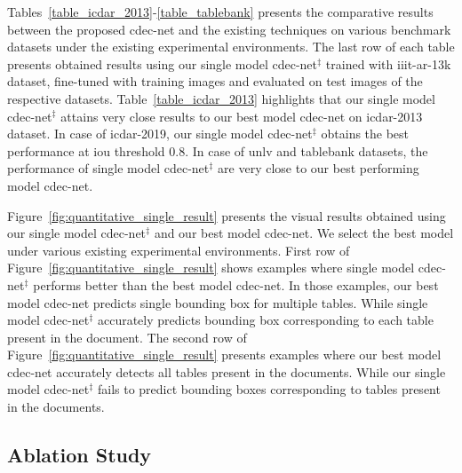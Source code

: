 \documentclass[a4paper,conference]{IEEEtran}
\begin{document}
Tables~\ref{table_icdar_2013}-\ref{table_tablebank} presents the comparative results between the proposed {\sc cd}e{\sc c-n}et and the existing techniques on various benchmark datasets under the existing experimental environments. The last row of each table presents obtained results using our single model {\sc cd}e{\sc c-n}et$^{\ddagger}$ trained with {\sc iiit-ar-13k} dataset, fine-tuned with training images and evaluated on test images of the respective datasets. Table~\ref{table_icdar_2013} highlights that our single model {\sc cd}e{\sc c-n}et$^{\ddagger}$ attains very close results to our best model {\sc cd}e{\sc c-n}et on {\sc icdar-2013} dataset. In case of {\sc icdar-2019}, our single model {\sc cd}e{\sc c-n}et$^{\ddagger}$ obtains the best performance at {\sc i}o{\sc u} threshold 0.8. In case of {\sc unlv} and {\sc t}able{\sc b}ank datasets, the performance of single model {\sc cd}e{\sc c-n}et$^{\ddagger}$ are very close to our best performing model {\sc cd}e{\sc c-n}et. 

Figure~\ref{fig:quantitative_single_result} presents the visual results obtained using our single model {\sc cd}e{\sc c-n}et$^{\ddagger}$ and our best model {\sc cd}e{\sc c-n}et. We select the best model under various existing experimental environments. First row of Figure~\ref{fig:quantitative_single_result} shows examples where single model {\sc cd}e{\sc c-n}et$^{\ddagger}$ performs better than the best model {\sc cd}e{\sc c-n}et. In those examples, our best model {\sc cd}e{\sc c-n}et predicts single bounding box for multiple tables. While single model {\sc cd}e{\sc c-n}et$^{\ddagger}$ accurately predicts bounding box corresponding to each table present in the document. The second row of Figure~\ref{fig:quantitative_single_result} presents examples where our best model {\sc cd}e{\sc c-n}et accurately detects all tables present in the documents. While our single model {\sc cd}e{\sc c-n}et$^{\ddagger}$ fails to predict bounding boxes corresponding to tables present in the documents. 

\subsection{Ablation Study}
\end{document}
